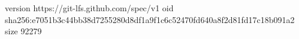 version https://git-lfs.github.com/spec/v1
oid sha256:e7051b3c44bb38d7255280d8df1a9f1c6c52470fd640a8f2d81fd17c18b091a2
size 92279
